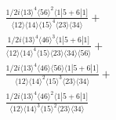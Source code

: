 \documentclass[varwidth, border=5pt]{standalone}
\begin{document}
\begin{my}
$\begin{gathered}
\scriptscriptstyle\frac{1/2i\langle13\rangle^4\langle56\rangle^2\langle1|5+6|1]}{\langle12\rangle\langle14\rangle\langle15\rangle^4\langle23\rangle\langle34\rangle}+\\
\scriptscriptstyle\frac{1/2i\langle13\rangle^4\langle46\rangle^3\langle1|5+6|1]}{\langle12\rangle\langle14\rangle^4\langle15\rangle\langle23\rangle\langle34\rangle\langle56\rangle}+\\
\scriptscriptstyle\frac{1/2i\langle13\rangle^4\langle46\rangle\langle56\rangle\langle1|5+6|1]}{\langle12\rangle\langle14\rangle^2\langle15\rangle^3\langle23\rangle\langle34\rangle}+\\
\scriptscriptstyle\frac{1/2i\langle13\rangle^4\langle46\rangle^2\langle1|5+6|1]}{\langle12\rangle\langle14\rangle^3\langle15\rangle^2\langle23\rangle\langle34\rangle}\phantom{+}
\end{gathered}$
\end{my}
\end{document}
